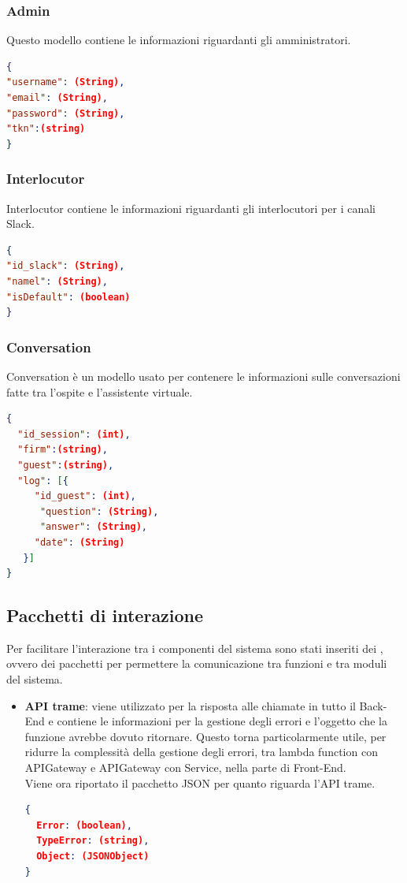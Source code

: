 \documentclass[../DefinizioneDiProdotto_v2.0.0.tex]{subfiles}
\begin{document}
\subsubsection{Admin}
Questo modello contiene le informazioni riguardanti gli amministratori.
\begin{lstlisting}[language=json,firstnumber=1]
{
"username": (String),
"email": (String),
"password": (String),
"tkn":(string)
}
\end{lstlisting}

\subsubsection{Interlocutor}
Interlocutor contiene le informazioni riguardanti gli interlocutori per i canali Slack.
\begin{lstlisting}[language=json,firstnumber=1]
{
"id_slack": (String),
"namel": (String),
"isDefault": (boolean)
}
\end{lstlisting}

\subsubsection{Conversation}
Conversation è un modello usato per contenere le informazioni sulle conversazioni fatte tra l'ospite e l'assistente virtuale.
\begin{lstlisting}[language=json,firstnumber=1]
{
  "id_session": (int),
  "firm":(string),
  "guest":(string),
  "log": [{
     "id_guest": (int),
      "question": (String),
      "answer": (String),
     "date": (String)
   }]
}
\end{lstlisting}

\subsection{Pacchetti di interazione}
Per facilitare l'interazione tra i componenti del sistema sono stati inseriti dei , ovvero dei pacchetti  per permettere la comunicazione tra funzioni e tra moduli del sistema.
\begin{itemize}
	\item \textbf{API trame}: viene utilizzato per la risposta alle chiamate in tutto il Back-End e contiene le informazioni per la gestione degli errori e l'oggetto che la funzione avrebbe dovuto ritornare. Questo torna particolarmente utile, per ridurre la complessità della gestione degli errori, tra lambda function con APIGateway e APIGateway con Service, nella parte di Front-End.\\
	      Viene ora riportato il pacchetto JSON per quanto riguarda l'API trame.
	      \begin{lstlisting}[language=json,firstnumber=1]
{
  Error: (boolean),
  TypeError: (string),
  Object: (JSONObject)
}
	      \end{lstlisting}
\end{itemize}
\end{document}
